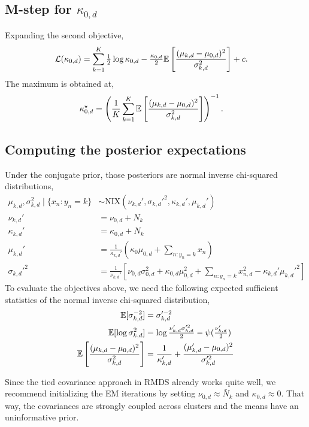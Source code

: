 \subsection{M-step for \texorpdfstring{$\kappa_{0,d}$}{κ₀}}
Expanding the second objective,
\begin{align*}
    \mathcal{L}(\kappa_{0,d}) &= \sum_{k=1}^K \tfrac{1}{2} \log \kappa_{0,d} - \tfrac{\kappa_{0,d}}{2} \mathbb{E} \left[\frac{(\mu_{k,d} - \mu_{0,d})^2}{\sigma_{k,d}^2}\right] + c.
\end{align*}
The maximum is obtained at,
\begin{align*}
    \kappa_{0,d}^\star &= \left(\frac{1}{K} \sum_{k=1}^K \mathbb{E} \left[\frac{(\mu_{k,d} - \mu_{0,d})^2}{\sigma_{k,d}^2}\right]\right)^{-1}.
\end{align*}

\subsection{Computing the posterior expectations}
Under the conjugate prior, those posteriors are normal inverse chi-squared distributions,
\begin{align*}
    \mu_{k,d}, \sigma_{k,d}^2 \mid \{x_n: y_n = k\}
    &\sim \mathrm{NIX}(\nu_{k,d}', \sigma_{k,d}'^2, \kappa_{k,d}', \mu_{k,d}') \\
    \nu_{k,d}' &= \nu_{0,d} + N_{k} \\
    \kappa_{k,d}' &= \kappa_{0,d} + N_{k} \\
    \mu_{k,d}' &= \frac{1}{\kappa_{k,d}'} \left(\kappa_0 \mu_{0,d} + \sum_{n: y_n=k} x_n \right) \\
    \sigma_{k,d}'^2 &= \frac{1}{\nu_{k,d}'} \left[\nu_{0,d} \sigma_{0,d}^2 + \kappa_{0,d} \mu_{0,d}^2 + \sum_{n:y_n=k} x_{n,d}^2 - \kappa_{k,d}' \mu_{k,d}'^2 \right]
\end{align*}
To evaluate the objectives above, we need the following expected sufficient statistics of the normal inverse chi-squared distribution,
\begin{align*}
    \mathbb{E}[\sigma_{k,d}^{-2}] &= \sigma_{k,d}'^{-2} \\
    \mathbb{E}[\log \sigma_{k,d}^2] &= \log \tfrac{\nu_{k,d}' \sigma_{k,d}'^2}{2} - \psi(\tfrac{\nu_{k,d}'}{2}) \\
    \mathbb{E} \left[\frac{(\mu_{k,d} - \mu_{0,d})^2}{\sigma_{k,d}^2}\right] &= \frac{1}{\kappa_{k,d}'} +  \frac{(\mu_{k,d}' - \mu_{0,d})^2}{\sigma_{k,d}'^2}
\end{align*}

Since the tied covariance approach in RMDS already works quite well, we recommend initializing the EM iterations by setting $\nu_{0,d} \approx \bar{N}_k$ and $\kappa_{0,d} \approx 0$. That way, the covariances are strongly coupled across clusters and the means have an uninformative prior.

